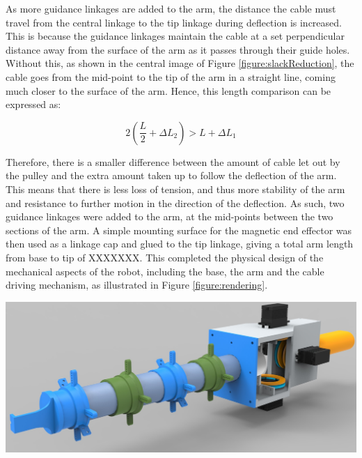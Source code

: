 \documentclass[11pt]{article}
\begin{document}
As more guidance linkages are added to the arm, the distance the cable must travel from the central linkage to the tip linkage during deflection is increased. This is because the guidance linkages maintain the cable at a set perpendicular distance away from the surface of the arm as it passes through their guide holes. Without this, as shown in the central image of Figure \ref{figure:slackReduction}, the cable goes from the mid-point to the tip of the arm in a straight line, coming much closer to the surface of the arm. Hence, this length comparison can be expressed as:



\begin{equation}\label{equation:guidanceLength}
2(\frac{L}{2} + \Delta L_{2}) > L + \Delta L_{1}
\end{equation}

Therefore, there is a smaller difference between the amount of cable let out by the pulley and the extra amount taken up to follow the deflection of the arm. This means that there is less loss of tension, and thus more stability of the arm and resistance to further motion in the direction of the deflection. As such, two guidance linkages were added to the arm, at the mid-points between the two sections of the arm. A simple mounting surface for the magnetic end effector was then used as a linkage cap and glued to the tip linkage, giving a total arm length from base to tip of XXXXXXX. This completed the physical design of the mechanical aspects of the robot, including the base, the arm and the cable driving mechanism, as illustrated in Figure \ref{figure:rendering}.

\begin{center}
\includegraphics[width=\textwidth]{images/rendering.png}
\label{figure:rendering}
\end{center}
\end{document}
